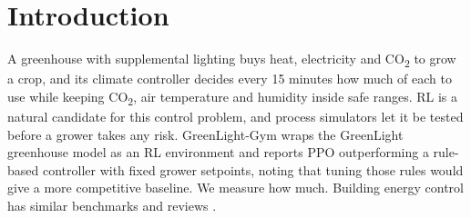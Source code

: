 \documentclass[letterpaper]{article} %
\newcommand{\cotwo}{CO\textsubscript{2}}
\begin{document}
\section{Introduction}

A greenhouse with supplemental lighting buys heat, electricity and \cotwo{} to grow a crop, and its climate controller decides every 15 minutes how much of each to use while keeping \cotwo{}, air temperature and humidity inside safe ranges. RL is a natural candidate for this control problem, and process simulators let it be tested before a grower takes any risk. GreenLight-Gym \cite{vanlaatum2025greenlightgym} wraps the GreenLight greenhouse model \cite{katzin2020greenlight} as an RL environment and reports PPO outperforming a rule-based controller with fixed grower setpoints, noting that tuning those rules would give a more competitive baseline. We measure how much. Building energy control has similar benchmarks \cite{blum2021boptest,jimenezraboso2021sinergym,vazquezcanteli2019citylearn} and reviews \cite{wang2020buildingrl,nagy2023tenquestions}.
\end{document}
